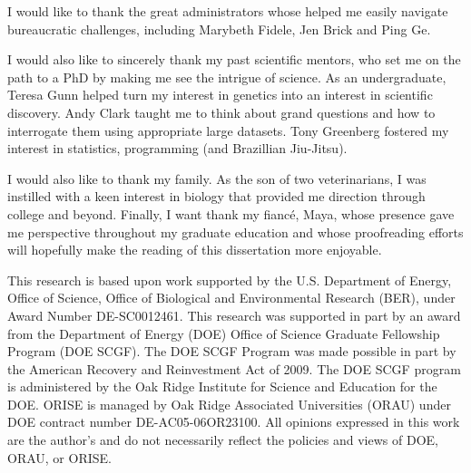 I would like to thank the great administrators whose helped me easily navigate bureaucratic challenges, including Marybeth Fidele, Jen Brick and Ping Ge.

I would also like to sincerely thank my past scientific mentors, who set me on the path to a PhD by making me see the intrigue of science. As an undergraduate, Teresa Gunn helped turn my interest in genetics into an interest in scientific discovery. Andy Clark taught me to think about grand questions and how to interrogate them using appropriate large datasets. Tony Greenberg fostered my interest in statistics, programming (and Brazillian Jiu-Jitsu).

I would also like to thank my family. As the son of two veterinarians,  I was instilled with a keen interest in biology that provided me direction through college and beyond. Finally, I want thank my fianc\'{e}, Maya, whose presence gave me perspective throughout my graduate education and whose proofreading efforts will hopefully make the reading of this dissertation more enjoyable.

This research is based upon work supported by the U.S. Department of Energy, Office of Science, Office of Biological and Environmental Research (BER), under Award Number DE-SC0012461. This research was supported in part by an award from the Department of Energy (DOE) Office of Science Graduate Fellowship Program (DOE SCGF). The DOE SCGF Program was made possible in part by the American Recovery and Reinvestment Act of 2009.  The DOE SCGF program is administered by the Oak Ridge Institute for Science and Education for the DOE. ORISE is managed by Oak Ridge Associated Universities (ORAU) under DOE contract number DE-AC05-06OR23100.  All opinions expressed in this work are the author's and do not necessarily reflect the policies and views of DOE, ORAU, or ORISE.